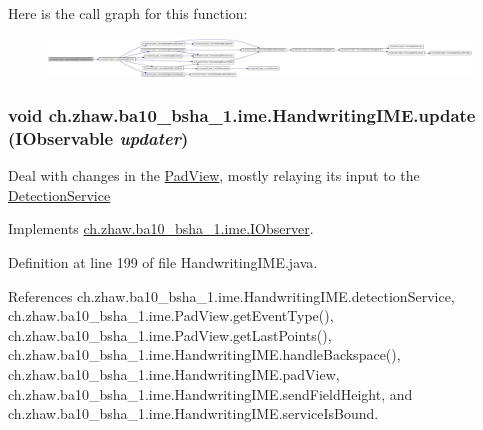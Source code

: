 Here is the call graph for this function:\nopagebreak
\begin{figure}[H]
\begin{center}
\leavevmode
\includegraphics[width=420pt]{classch_1_1zhaw_1_1ba10__bsha__1_1_1ime_1_1HandwritingIME_a25b3410857b8a7b81ad09b2a76ca352c_cgraph}
\end{center}
\end{figure}
\hypertarget{classch_1_1zhaw_1_1ba10__bsha__1_1_1ime_1_1HandwritingIME_a788cf4563e1480f6c3ea3ca6f07b2623}{
\subsubsection[{update}]{\setlength{\rightskip}{0pt plus 5cm}void ch.zhaw.ba10\_\-bsha\_\-1.ime.HandwritingIME.update ({\bf IObservable} {\em updater})}}
\label{classch_1_1zhaw_1_1ba10__bsha__1_1_1ime_1_1HandwritingIME_a788cf4563e1480f6c3ea3ca6f07b2623}
Deal with changes in the \hyperlink{classch_1_1zhaw_1_1ba10__bsha__1_1_1ime_1_1PadView}{PadView}, mostly relaying its input to the \hyperlink{}{DetectionService} 

Implements \hyperlink{interfacech_1_1zhaw_1_1ba10__bsha__1_1_1ime_1_1IObserver_a9bd8c4a6a6aaaf70d771c8f4b08a748d}{ch.zhaw.ba10\_\-bsha\_\-1.ime.IObserver}.

Definition at line 199 of file HandwritingIME.java.

References ch.zhaw.ba10\_\-bsha\_\-1.ime.HandwritingIME.detectionService, ch.zhaw.ba10\_\-bsha\_\-1.ime.PadView.getEventType(), ch.zhaw.ba10\_\-bsha\_\-1.ime.PadView.getLastPoints(), ch.zhaw.ba10\_\-bsha\_\-1.ime.HandwritingIME.handleBackspace(), ch.zhaw.ba10\_\-bsha\_\-1.ime.HandwritingIME.padView, ch.zhaw.ba10\_\-bsha\_\-1.ime.HandwritingIME.sendFieldHeight, and ch.zhaw.ba10\_\-bsha\_\-1.ime.HandwritingIME.serviceIsBound.

